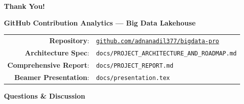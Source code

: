 \documentclass[aspectratio=169, 10pt]{beamer}
\begin{document}
\begin{frame}[plain]
  \begin{center}
    \vspace{1.0cm}
    {\huge \textbf{\textcolor{NavyBlue}{Thank You!}}}
    
    \vspace{0.4cm}
    {\large \textbf{GitHub Contribution Analytics — Big Data Lakehouse}}
    
    \vspace{0.6cm}
    \begin{tabular}{rl}
      \textbf{Repository}: & \href{https://github.com/adnanadil377/bigdata-pro}{\texttt{github.com/adnanadil377/bigdata-pro}} \\
      \textbf{Architecture Spec}: & \texttt{docs/PROJECT\_ARCHITECTURE\_AND\_ROADMAP.md} \\
      \textbf{Comprehensive Report}: & \texttt{docs/PROJECT\_REPORT.md} \\
      \textbf{Beamer Presentation}: & \texttt{docs/presentation.tex}
    \end{tabular}

    \vspace{0.8cm}
    {\Large \textbf{\textcolor{TealAccent}{Questions \& Discussion}}}
  \end{center}
\end{frame}
\end{document}
